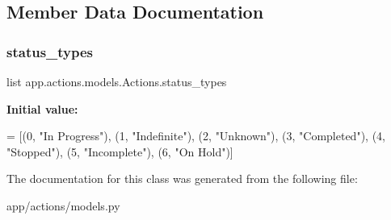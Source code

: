 \subsection{Member Data Documentation}
\mbox{\label{classapp_1_1actions_1_1models_1_1_actions_aff60531385518f41d1aec340f0e2cf2f}} 
\subsubsection{\texorpdfstring{status\+\_\+types}{status\_types}}
{\footnotesize\ttfamily list app.\+actions.\+models.\+Actions.\+status\+\_\+types\hspace{0.3cm}{\ttfamily [static]}}

{\bfseries Initial value\+:}
\begin{DoxyCode}
=  [(0, \textcolor{stringliteral}{"In Progress"}), (1, \textcolor{stringliteral}{"Indefinite"}), (2, \textcolor{stringliteral}{"Unknown"}),
                    (3, \textcolor{stringliteral}{"Completed"}), (4, \textcolor{stringliteral}{"Stopped"}), (5, \textcolor{stringliteral}{"Incomplete"}), (6, \textcolor{stringliteral}{"On Hold"})]
\end{DoxyCode}


The documentation for this class was generated from the following file\+:\begin{DoxyCompactItemize}
\item 
app/actions/models.\+py\end{DoxyCompactItemize}
